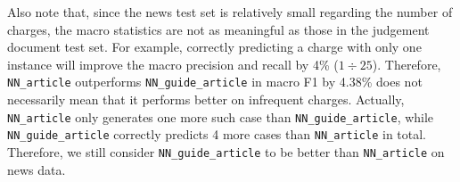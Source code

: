 Also note that, since the news test set is relatively small regarding the number of charges, the macro statistics are not as meaningful as those in the judgement document test set. For example, correctly predicting a charge with only one instance will improve the macro precision and recall by 4\% (${1}\div{25}$). Therefore, \texttt{NN\_article} outperforms \texttt{NN\_guide\_article} in macro F1 by 4.38\% does not necessarily mean that it performs better on infrequent charges. 
Actually, %
\texttt{NN\_article} only generates one more such case than \texttt{NN\_guide\_article}, while \texttt{NN\_guide\_article} correctly predicts 4 more cases than \texttt{NN\_article} in total. Therefore, we still consider \texttt{NN\_guide\_article} to be better than \texttt{NN\_article} on news data.



